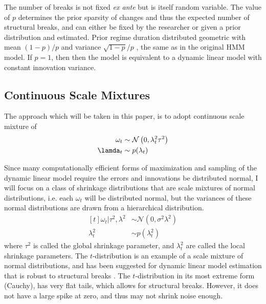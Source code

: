 \documentclass{article}
\newcommand{\paren}[1]{\ensuremath{\left(#1\right)}}
\newcommand{\dnorm}[1]{\ensuremath{\mathcal{N}\paren{#1}}}
\begin{document}
The number of breaks is not fixed \textit{ex ante} but is itself random variable.
The value of $p$ determines the prior sparsity of changes and thus the expected number of structural breaks,
and can either be fixed by the researcher or given a prior distribution and estimated.
Prior regime duration distributed geometric with mean $(1 - p) / p$ and variance $\sqrt{1 - p} / p$ \parencite[68]{GiordaniKohn2008}, the same as in the original \textcite{Chib1998} HMM model.
If $p = 1$, then then the model is equivalent to a dynamic linear model with constant innovation variance.

\subsection{Continuous Scale Mixtures}
\label{sec:shrinkage}

The approach which will be taken in this paper, is to adopt continuous scale mixture of 
\begin{equation}
  \label{eq:4}
  \begin{aligned}[t]
    \omega_{t} &\sim \dnorm{0, \lambda_{t}^{2} \tau^{2}} \\
    \lamda_{t} &\sim p(\lambda_{t})
  \end{aligned}
\end{equation}

Since many computationally efficient forms of maximization and sampling of the dynamic linear model require the errors and innovations be distributed normal, I will focus on a class of shrinkage distributions that are scale mixtures of normal distributions, i.e. each $\omega_{t}$ will be distributed normal, but the variances of these normal distributions are drawn from a hierarchical distribution.
\begin{equation}
  \label{eq:6}
  \begin{aligned}[t]
    \omega_{t} | \tau^{2}, \lambda^{2} & \sim \dnorm{0, \sigma^{2} \lambda^{2}} \\
    \lambda_{t}^{2} & \sim p(\lambda^{2}_{t})
  \end{aligned}
\end{equation}
where $\tau^{2}$ is called the global shrinkage parameter, and $\lambda_{t}^{2}$ are called the local shrinkage parameters.
The $t$-distribution is an example of a scale mixture of normal distributions, and has been suggested for dynamic linear model estimation that is robust to structural breaks \parencites{HarveyKoopman2000}{PetrisPetroneEtAl2009}.
The $t$-distribution in its most extreme form (Cauchy), has very flat tails, which allows for structural breaks.
However, it does not have a large spike at zero, and thus may not shrink noise enough.
\end{document}
